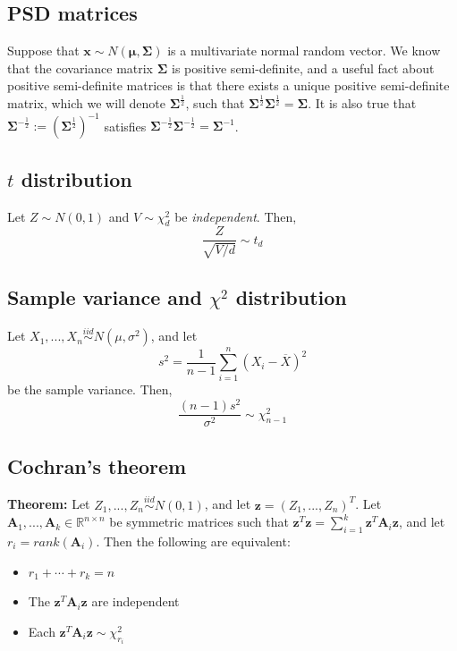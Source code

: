 \documentclass[11pt]{article}
\begin{document}
\subsection*{PSD matrices}

Suppose that $\mathbf{x} \sim N(\boldsymbol{\mu}, \boldsymbol{\Sigma})$ is a multivariate normal random vector. We know that the covariance matrix $\boldsymbol{\Sigma}$ is positive semi-definite, and a useful fact about positive semi-definite matrices is that there exists a unique positive semi-definite matrix, which we will denote $\boldsymbol{\Sigma}^{\frac{1}{2}}$, such that $\boldsymbol{\Sigma}^{\frac{1}{2}}\boldsymbol{\Sigma}^{\frac{1}{2}} = \boldsymbol{\Sigma}$. It is also true that $\boldsymbol{\Sigma}^{-\frac{1}{2}} := (\boldsymbol{\Sigma}^{\frac{1}{2}})^{-1}$ satisfies $\boldsymbol{\Sigma}^{-\frac{1}{2}}\boldsymbol{\Sigma}^{-\frac{1}{2}} = \boldsymbol{\Sigma}^{-1}$.

\subsection*{$t$ distribution}

Let $Z \sim N(0, 1)$ and $V \sim \chi^2_d$ be \textit{independent}. Then, 
$$\dfrac{Z}{\sqrt{V/d}} \sim t_{d}$$

\subsection*{Sample variance and $\chi^2$ distribution}

Let $X_1,...,X_n \overset{iid}{\sim} N(\mu, \sigma^2)$, and let
$$s^2 = \frac{1}{n-1} \sum \limits_{i=1}^n (X_i - \overline{X})^2$$
be the sample variance. Then,
$$\frac{(n-1)s^2}{\sigma^2} \sim \chi^2_{n-1}$$

\subsection*{Cochran's theorem}

\textbf{Theorem:} Let $Z_1,...,Z_n \overset{iid}{\sim} N(0, 1)$, and let $\mathbf{z} = (Z_1,...,Z_n)^T$. Let $\mathbf{A}_1,...,\mathbf{A}_k \in \mathbb{R}^{n \times n}$ be symmetric matrices such that $\mathbf{z}^T\mathbf{z} = \sum \limits_{i=1}^k \mathbf{z}^T \mathbf{A}_i \mathbf{z}$, and let $r_i = rank(\mathbf{A}_i)$. Then the following are equivalent:
\begin{itemize}
\item $r_1 + \cdots + r_k = n$
\item The $\mathbf{z}^T \mathbf{A}_i \mathbf{z}$ are independent
\item Each $\mathbf{z}^T \mathbf{A}_i \mathbf{z} \sim \chi^2_{r_i}$
\end{itemize}
\end{document}
